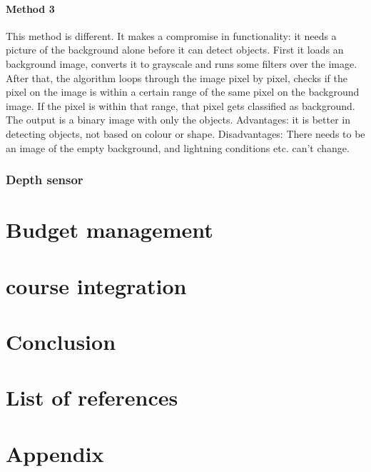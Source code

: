 \documentclass{article}
\begin{document}
\paragraph{Method 3}
This method is different. It makes a compromise in functionality: it needs a picture of the background alone before it can detect objects. First it loads an background image, converts it to grayscale and runs some filters over the image. After that, the algorithm loops through the image pixel by pixel, checks if the pixel on the image is within a certain range of the same pixel on the background image. If the pixel is within that range, that pixel gets classified as background. The output is a binary image with only the objects.  
Advantages: it is better in detecting objects, not based on colour or shape.
Disadvantages: There needs to be an image of the empty background, and lightning conditions etc. can’t change.


\subsubsection{Depth sensor}

\section{Budget management}

\section{course integration}

\section{Conclusion}

\section{List of references}

\section{Appendix}
\end{document}
